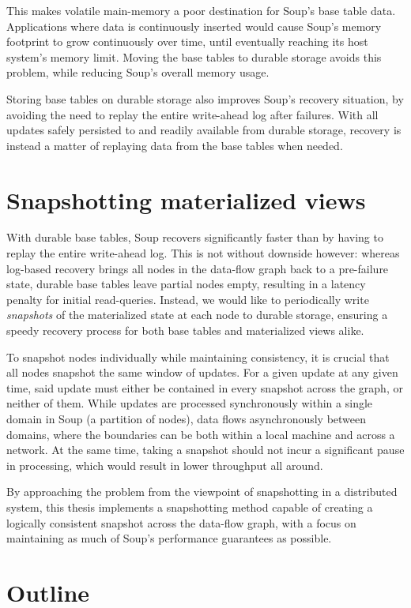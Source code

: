This makes volatile main-memory a poor destination for Soup's base table data.
Applications where data is continuously inserted would cause Soup's memory
footprint to grow continuously over time, until eventually reaching its host
system's memory limit. Moving the base tables to durable storage avoids this
problem, while reducing Soup's overall memory usage.

Storing base tables on durable storage also improves Soup's recovery situation,
by avoiding the need to replay the entire write-ahead log after failures. With
all updates safely persisted to and readily available from durable storage,
recovery is instead a matter of replaying data from the base tables when needed.

\section{Snapshotting materialized views}

With durable base tables, Soup recovers significantly faster than by having to
replay the entire write-ahead log. This is not without downside however: whereas
log-based recovery brings all nodes in the data-flow graph back to a
pre-failure state, durable base tables leave partial nodes empty, resulting in a
latency penalty for initial read-queries. Instead, we would like to periodically
write \textit{snapshots} of the materialized state at each node to durable
storage, ensuring a speedy recovery process for both base tables and
materialized views alike.

To snapshot nodes individually while maintaining consistency, it is crucial that
all nodes snapshot the same window of updates. For a given update at any given
time, said update must either be contained in every snapshot across the graph,
or neither of them. While updates are processed synchronously within a single
domain in Soup (a partition of nodes), data flows asynchronously between
domains, where the boundaries can be both within a local machine and across a
network. At the same time, taking a snapshot should not incur a significant
pause in processing, which would result in lower throughput all around.

By approaching the problem from the viewpoint of snapshotting in a distributed
system, this thesis implements a snapshotting method capable of creating a
logically consistent snapshot across the data-flow graph, with a focus on
maintaining as much of Soup's performance guarantees as possible.

\section{Outline}

